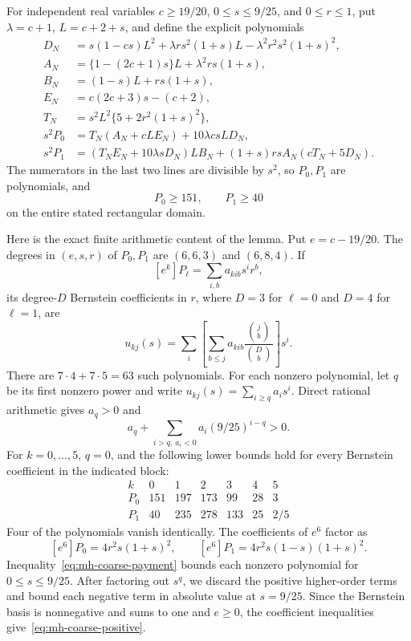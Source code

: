 \begin{lemma}\label{lem:mh-coarse-arithmetic}
For independent real variables $c\ge19/20$, $0\le s\le9/25$, and $0\le r\le1$, put $\lambda=c+1$, $L=c+2+s$, and define the explicit polynomials
\begin{align*}
 D_N&=s(1-cs)L^2+\lambda r s^2(1+s)L
                         -\lambda^2r^2s^2(1+s)^2,\\
 A_N&=\{1-(2c+1)s\}L+\lambda^2rs(1+s),\\
 B_N&=(1-s)L+rs(1+s),\\
 E_N&=c(2c+3)s-(c+2),\\
 T_N&=s^2L^2\{5+2r^2(1+s)^2\},\\
 s^2P_0&=T_N(A_N+cLE_N)+10\lambda csLD_N,\\
 s^2P_1&=(T_NE_N+10\lambda sD_N)LB_N
                   +(1+s)rsA_N(cT_N+5D_N).
\end{align*}
The numerators in the last two lines are divisible by $s^2$, so $P_0,P_1$ are polynomials, and
\begin{equation}\label{eq:mh-coarse-positive}
 P_0\ge151,\qquad P_1\ge40
\end{equation}
on the entire stated rectangular domain.
\end{lemma}

Here is the exact finite arithmetic content of the lemma. Put $e=c-19/20$. The degrees in $(e,s,r)$ of $P_0,P_1$ are $(6,6,3)$ and $(6,8,4)$. If
\[
 [e^k]P_\ell=\sum_{i,b}a_{kib}s^ir^b,
\]
its degree-$D$ Bernstein coefficients in $r$, where $D=3$ for $\ell=0$ and $D=4$ for $\ell=1$, are
\[
 u_{kj}(s)=\sum_i\left[\sum_{b\le j}a_{kib}
                \frac{\binom jb}{\binom Db}\right]s^i.
\]
There are $7\cdot4+7\cdot5=63$ such polynomials. For each nonzero polynomial, let $q$ be its first nonzero power and write $u_{kj}(s)=\sum_{i\ge q}a_is^i$. Direct rational arithmetic gives $a_q>0$ and
\begin{equation}\label{eq:mh-coarse-payment}
 a_q+\sum_{i>q,\ a_i<0}a_i(9/25)^{i-q}>0.
\end{equation}
For $k=0,\ldots,5$, $q=0$, and the following lower bounds hold for every Bernstein coefficient in the indicated block:
\[
\begin{array}{c|rrrrrr}
 k&0&1&2&3&4&5\\ \hline
 P_0&151&197&173&99&28&3\\
 P_1&40&235&278&133&25&2/5
\end{array}
\]
Four of the polynomials vanish identically. The coefficients of $e^6$ factor as
\[
 [e^6]P_0=4r^2s(1+s)^2,\qquad
 [e^6]P_1=4r^2s(1-s)(1+s)^2.
\]
Inequality~\eqref{eq:mh-coarse-payment} bounds each nonzero polynomial for $0\le s\le9/25$. After factoring out $s^q$, we discard the positive higher-order terms and bound each negative term in absolute value at $s=9/25$. Since the Bernstein basis is nonnegative and sums to one and $e\ge0$, the coefficient inequalities give~\eqref{eq:mh-coarse-positive}.

